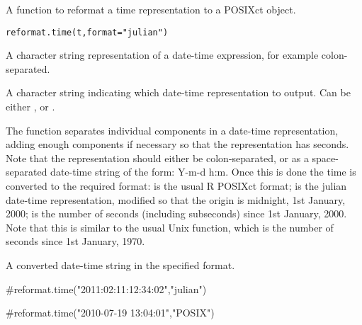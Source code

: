 \documentclass[a4paper]{book}
\begin{document}
%
\begin{Description}\relax
A function to reformat a time representation to a POSIXct object.
\end{Description}
%
\begin{Usage}
\begin{verbatim}
reformat.time(t,format="julian")
\end{verbatim}
\end{Usage}
%
\begin{Arguments}
\begin{ldescription}
\item[\code{t}] A character string representation of a date-time expression, for example colon-separated.
\item[\code{format}] A character string indicating which date-time representation to output.  Can be either ,  or .
\end{ldescription}
\end{Arguments}
%
\begin{Details}\relax
The function separates individual components in a date-time representation, adding enough components if necessary so that the representation has seconds.
Note that the representation should either be colon-separated, or as a space-separated date-time string of the form: Y-m-d h:m.  Once this is done the time
is converted to the required format:  is the usual R POSIXct format;  is the julian date-time representation, modified so that the origin is midnight, 1st January, 2000;  is the number of seconds (including subseconds) since 1st January, 2000.  Note that this is similar to the usual Unix  function, which is the number of seconds since 1st January, 1970.
\end{Details}
%
\begin{Value}
A converted date-time string in the specified format.
\end{Value}
%
\begin{Examples}
\begin{ExampleCode}

#reformat.time("2011:02:11:12:34:02","julian")

#reformat.time("2010-07-19 13:04:01","POSIX")

\end{ExampleCode}
\end{Examples}
\printindex{}
\end{document}
